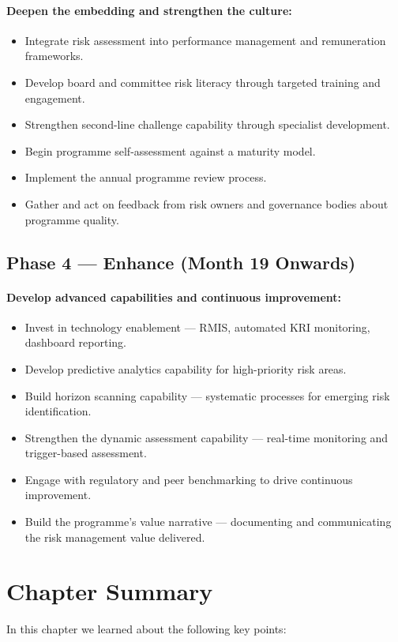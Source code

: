\paragraph{Deepen the embedding and strengthen the culture:}
\begin{itemize}
  \item{Integrate risk assessment into performance management and remuneration frameworks.}
  \item{Develop board and committee risk literacy through targeted training and engagement.}
  \item{Strengthen second-line challenge capability through specialist development.}
  \item{Begin programme self-assessment against a maturity model.}
  \item{Implement the annual programme review process.}
  \item{Gather and act on feedback from risk owners and governance bodies about programme quality.}
\end{itemize}

\subsection{Phase 4 — Enhance (Month 19 Onwards)}
\paragraph{Develop advanced capabilities and continuous improvement:}
\begin{itemize}
  \item{Invest in technology enablement — RMIS, automated KRI monitoring, dashboard reporting.}
  \item{Develop predictive analytics capability for high-priority risk areas.}
  \item{Build horizon scanning capability — systematic processes for emerging risk identification.}
  \item{Strengthen the dynamic assessment capability — real-time monitoring and trigger-based assessment.}
  \item{Engage with regulatory and peer benchmarking to drive continuous improvement.}
  \item{Build the programme's value narrative — documenting and communicating the risk management value delivered.}
\end{itemize}

\newpage
\section{Chapter Summary}
In this chapter we learned about the following key points:


